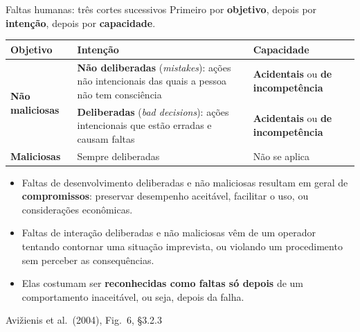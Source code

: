 \documentclass{beamer}
\newcommand{\sect}[1]{\par\smallskip\hfill{\tiny\color{black!55}Avi\v{z}ienis et al.\ (2004), #1}}
\begin{document}
\begin{frame}{Faltas humanas: tr\^es cortes sucessivos}
    \scriptsize
    Primeiro por \textbf{objetivo}, depois por \textbf{inten\c{c}\~ao}, depois por \textbf{capacidade}.
    \medskip
    \begin{tabularx}{\linewidth}{@{}p{2.6cm} p{3.1cm} >{\raggedright\arraybackslash}X@{}}
        \toprule
        \textbf{Objetivo} & \textbf{Inten\c{c}\~ao} & \textbf{Capacidade} \\
        \midrule
        \multirow{2}{2.6cm}{\textbf{N\~ao maliciosas}} & \textbf{N\~ao deliberadas} (\textit{mistakes}): a\c{c}\~oes n\~ao intencionais das quais a pessoa n\~ao tem consci\^encia & \textbf{Acidentais} ou \textbf{de incompet\^encia} \\
        \addlinespace
         & \textbf{Deliberadas} (\textit{bad decisions}): a\c{c}\~oes intencionais que est\~ao erradas e causam faltas & \textbf{Acidentais} ou \textbf{de incompet\^encia} \\
        \midrule
        \textbf{Maliciosas} & Sempre deliberadas & N\~ao se aplica \\
        \bottomrule
    \end{tabularx}
    \medskip
    \begin{itemize}
        \item Faltas de desenvolvimento deliberadas e n\~ao maliciosas resultam em geral de \textbf{compromissos}: preservar desempenho aceit\'avel, facilitar o uso, ou considera\c{c}\~oes econ\^omicas.
        \item Faltas de intera\c{c}\~ao deliberadas e n\~ao maliciosas v\^em de um operador tentando contornar uma situa\c{c}\~ao imprevista, ou violando um procedimento sem perceber as consequ\^encias.
        \item Elas costumam ser \textbf{reconhecidas como faltas s\'o depois} de um comportamento inaceit\'avel, ou seja, depois da falha.
    \end{itemize}
    \sect{Fig.\ 6, \S3.2.3}
\end{frame}
\end{document}
